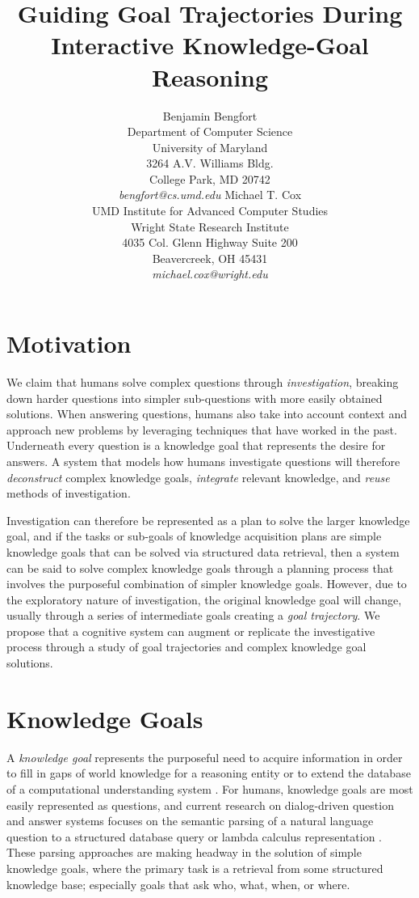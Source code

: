 \documentclass[letterpaper]{article}
\title{Guiding Goal Trajectories During Interactive Knowledge-Goal Reasoning}
\author{Benjamin Bengfort\\
Department of Computer Science\\
University of Maryland\\
3264 A.V. Williams Bldg.\\
College Park, MD 20742\\
\textit{bengfort@cs.umd.edu}
\And
Michael T. Cox\\
UMD Institute for Advanced Computer Studies\\
Wright State Research Institute\\
4035 Col. Glenn Highway Suite 200\\
Beavercreek, OH 45431\\
\textit{michael.cox@wright.edu}
}
\begin{document}
    \maketitle

\section{Motivation}

We claim that humans solve complex questions through \textit{investigation}, breaking down harder questions into simpler sub-questions with more easily obtained solutions. When answering questions, humans also take into account context and approach new problems by leveraging techniques that have worked in the past. Underneath every question is a knowledge goal that represents the desire for answers. A system that models how humans investigate questions will therefore \textit{deconstruct} complex knowledge goals, \textit{integrate} relevant knowledge, and \textit{reuse} methods of investigation.

Investigation can therefore be represented as a plan to solve the larger knowledge goal, and if the tasks or sub-goals of knowledge acquisition plans are simple knowledge goals that can be solved via structured data retrieval, then a system can be said to solve complex knowledge goals through a planning process that involves the purposeful combination of simpler knowledge goals. However, due to the exploratory nature of investigation, the original knowledge goal will change, usually through a series of intermediate goals creating a \textit{goal trajectory}. We propose that a cognitive system can augment or replicate the investigative process through a study of goal trajectories and complex knowledge goal solutions.


\section{Knowledge Goals}

A \textit{knowledge goal} represents the purposeful need to acquire information in order to fill in gaps of world knowledge for a reasoning entity or to extend the database of a computational understanding system \cite{ram_goal-based_1991}. For humans, knowledge goals are most easily represented as questions, and current research on dialog-driven question and answer systems focuses on the semantic parsing of a natural language question to a structured database query \cite{yahya_natural_2012} or lambda calculus representation \cite{berant_semantic_2013}. These parsing approaches are making headway in the solution of simple knowledge goals, where the primary task is a retrieval from some structured knowledge base; especially goals that ask who, what, when, or where.
\end{document}
